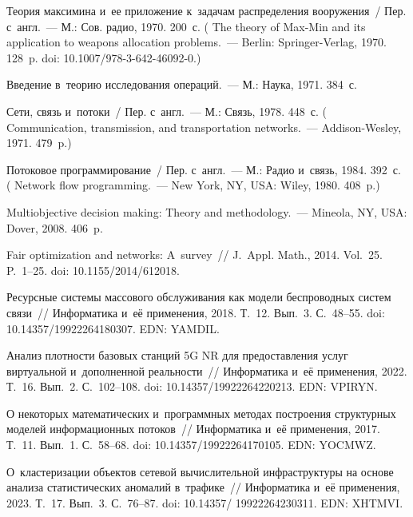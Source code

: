\begin{multicols}{2}
{{\begin{thebibliography}{99}
 Теория максимина и~ее приложение к~задачам распределения вооружения~/
Пер. с~англ.~--- М.: Сов. радио, 1970. 200~с.
( 
The theory of Max-Min and its application to weapons allocation problems.~--- Berlin: Springer-Verlag, 1970. 128~p. 
doi: 10.1007/978-3-642-46092-0.)


 Введение в~теорию исследования операций.~--- М.: Наука, 1971. 384~с.

 Сети, связь и~потоки~/ Пер. с~англ.~--- М.: Связь, 
1978. 448~с. (  
Communication, transmission, and transportation networks.~--- Addison-Wesley, 1971. 479~p.)


 Потоковое программирование~/ Пер. с~англ.~--- М.:  Радио и~связь, 1984. 392~с.
(  
Network flow programming.~--- New York, NY, USA: Wiley, 1980. 408~p.)


Multiobjective decision making: Theory and methodology.~--- Mineola, NY, USA: Dover, 2008. 406~p.

Fair optimization and networks: A~survey~// J.~Appl. Math., 2014. Vol.~25. P.~1--25.
doi: 10.1155/2014/612018.



   Ресурсные системы массового обслуживания 
как модели беспроводных сис\-тем связи~//  Информатика и~её применения, 2018. 
Т.~12. Вып.~3. С.~48--55. doi: 10.14357/19922264180307. EDN: YAMDIL.
    
 Анализ плотности базовых 
станций 5G NR для предоставления услуг виртуальной и~дополненной реальности~// 
Информатика и~её применения, 2022. Т.~16. Вып.~2. С.~102--108. doi: 10.14357/19922264220213. EDN: VPIRYN.
    


 О некоторых математических и~программных методах построения структурных моделей информационных потоков~// 
Информатика и~её применения, 2017. Т.~11. Вып.~1. С.~58--68. 
doi: 10.14357/19922264170105. EDN: YOCMWZ.

О~клас\-те\-ри\-за\-ции объектов сетевой вычислительной инфраструктуры на основе анализа 
статистических аномалий в~трафике~// Информатика и~её \mbox{применения}, 2023. Т.~17. 
Вып.~3. С.~76--87. doi: 10.14357/ 19922264230311. EDN: XHTMVI.


\end{thebibliography}}}
\end{multicols}
